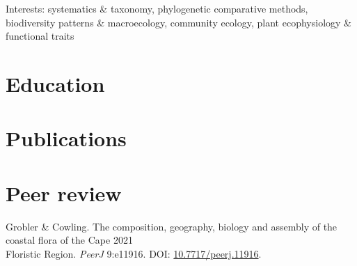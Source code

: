 \documentclass[10pt]{article}
\begin{document}


\bigskip

Interests:
  systematics \& taxonomy,
  phylogenetic comparative methods,
  biodiversity patterns \& macroecology,
  community ecology,
  plant ecophysiology \& functional traits





\section*{Education} %



\bigskip

\section*{Publications} %



\bigskip

\section*{Peer review} %

Grobler \& Cowling. The composition, geography, biology and assembly of the
  coastal flora of the Cape                                       \hfill 2021 \\
  \hspace{2em} Floristic Region. \textit{PeerJ} 9:e11916. DOI:
    \href{https://doi.org/10.7717/peerj.11916}{10.7717/peerj.11916}.
\end{document}
